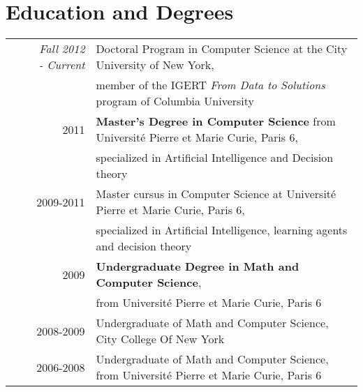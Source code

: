\documentclass[a4paper,10pt]{article}
\begin{document}
\section{Education and Degrees}
\begin{tabular}{rl}	
 \emph{ ~~~ Fall 2012 - Current} & Doctoral Program in Computer Science at the City University of New York, \\
& member of the IGERT {\em From Data to Solutions} program of Columbia University \\
\textsc{2011} & {\bfseries Master's Degree in Computer Science} from Université Pierre et Marie Curie, Paris 6,\\
& specialized in Artificial Intelligence and Decision theory\\ 
\textsc{2009-2011} & Master cursus in Computer Science at Université Pierre et Marie Curie, Paris 6, \\
&  specialized in Artificial Intelligence, learning agents and decision theory \\
\textsc{2009} & {\bfseries Undergraduate Degree in Math and Computer Science},\\
& from Université Pierre et Marie Curie, Paris 6\\
\textsc{2008-2009} & Undergraduate of Math and Computer Science, City College Of New York\\
\textsc{2006-2008} & Undergraduate of Math and Computer Science, from Université Pierre et Marie Curie, Paris 6\\
\end{tabular}\\
\end{document}
